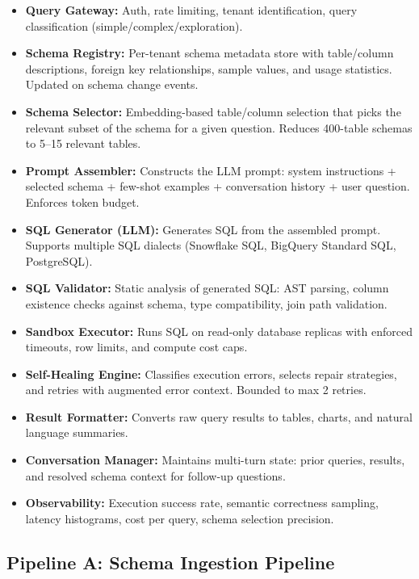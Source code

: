 \begin{itemize}
  \item \textbf{Query Gateway:} Auth, rate limiting, tenant identification, query classification (simple/complex/exploration).
  \item \textbf{Schema Registry:} Per-tenant schema metadata store with table/column descriptions, foreign key relationships, sample values, and usage statistics. Updated on schema change events.
  \item \textbf{Schema Selector:} Embedding-based table/column selection that picks the relevant subset of the schema for a given question. Reduces 400-table schemas to 5--15 relevant tables.
  \item \textbf{Prompt Assembler:} Constructs the LLM prompt: system instructions + selected schema + few-shot examples + conversation history + user question. Enforces token budget.
  \item \textbf{SQL Generator (LLM):} Generates SQL from the assembled prompt. Supports multiple SQL dialects (Snowflake SQL, BigQuery Standard SQL, PostgreSQL).
  \item \textbf{SQL Validator:} Static analysis of generated SQL: AST parsing, column existence checks against schema, type compatibility, join path validation.
  \item \textbf{Sandbox Executor:} Runs SQL on read-only database replicas with enforced timeouts, row limits, and compute cost caps.
  \item \textbf{Self-Healing Engine:} Classifies execution errors, selects repair strategies, and retries with augmented error context. Bounded to max 2 retries.
  \item \textbf{Result Formatter:} Converts raw query results to tables, charts, and natural language summaries.
  \item \textbf{Conversation Manager:} Maintains multi-turn state: prior queries, results, and resolved schema context for follow-up questions.
  \item \textbf{Observability:} Execution success rate, semantic correctness sampling, latency histograms, cost per query, schema selection precision.
\end{itemize}

\subsection*{Pipeline A: Schema Ingestion Pipeline}

